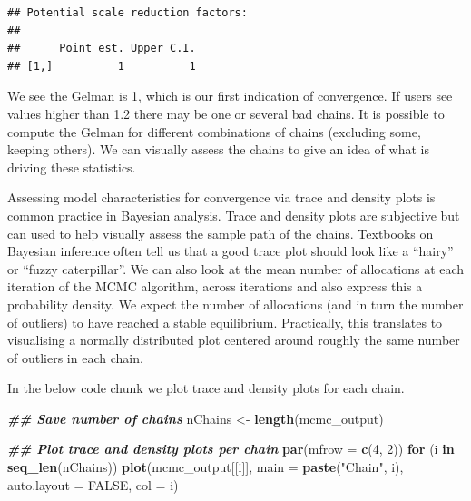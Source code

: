 \documentclass[9pt,a4paper,]{extarticle}
\newenvironment{Shaded}{\begin{snugshade}}{\end{snugshade}}
\newcommand{\AttributeTok}[1]{\textcolor[rgb]{0.13,0.29,0.53}{#1}}
\newcommand{\ConstantTok}[1]{\textcolor[rgb]{0.56,0.35,0.01}{#1}}
\newcommand{\ControlFlowTok}[1]{\textcolor[rgb]{0.13,0.29,0.53}{\textbf{#1}}}
\newcommand{\DecValTok}[1]{\textcolor[rgb]{0.00,0.00,0.81}{#1}}
\newcommand{\DocumentationTok}[1]{\textcolor[rgb]{0.56,0.35,0.01}{\textbf{\textit{#1}}}}
\newcommand{\FunctionTok}[1]{\textcolor[rgb]{0.13,0.29,0.53}{\textbf{#1}}}
\newcommand{\NormalTok}[1]{#1}
\newcommand{\OtherTok}[1]{\textcolor[rgb]{0.56,0.35,0.01}{#1}}
\newcommand{\StringTok}[1]{\textcolor[rgb]{0.31,0.60,0.02}{#1}}
\begin{document}
\begin{verbatim}
## Potential scale reduction factors:
## 
##      Point est. Upper C.I.
## [1,]          1          1
\end{verbatim}

We see the Gelman is 1, which is our first indication of convergence. If users
see values higher than 1.2 there may be one or several bad chains. It is
possible to compute the Gelman for different combinations of chains (excluding
some, keeping others). We can visually assess the chains to give an idea of what
is driving these statistics.

Assessing model characteristics for convergence via trace and density
plots is common practice in Bayesian analysis. Trace and density plots are
subjective but can used to help visually assess the sample path of the chains.
Textbooks on Bayesian inference often tell us that a good trace plot should
look like a ``hairy'' or ``fuzzy caterpillar''. We can also look at the mean
number of allocations at each iteration of the MCMC algorithm, across iterations
and also express this a probability density. We expect the number of allocations
(and in turn the number of outliers) to have reached a stable equilibrium.
Practically, this translates to visualising a normally distributed plot centered
around roughly the same number of outliers in each chain.

In the below code chunk we plot trace and density plots for each chain.

\begin{Shaded}
\begin{Highlighting}[]
\DocumentationTok{\#\# Save number of chains}
\NormalTok{nChains }\OtherTok{\textless{}{-}} \FunctionTok{length}\NormalTok{(mcmc\_output)}

\DocumentationTok{\#\# Plot trace and density plots per chain}
\FunctionTok{par}\NormalTok{(}\AttributeTok{mfrow =} \FunctionTok{c}\NormalTok{(}\DecValTok{4}\NormalTok{, }\DecValTok{2}\NormalTok{))}
\ControlFlowTok{for}\NormalTok{ (i }\ControlFlowTok{in} \FunctionTok{seq\_len}\NormalTok{(nChains))}
  \FunctionTok{plot}\NormalTok{(mcmc\_output[[i]], }\AttributeTok{main =} \FunctionTok{paste}\NormalTok{(}\StringTok{"Chain"}\NormalTok{, i), }
       \AttributeTok{auto.layout =} \ConstantTok{FALSE}\NormalTok{, }\AttributeTok{col =}\NormalTok{ i)}
\end{Highlighting}
\end{Shaded}
\end{document}
